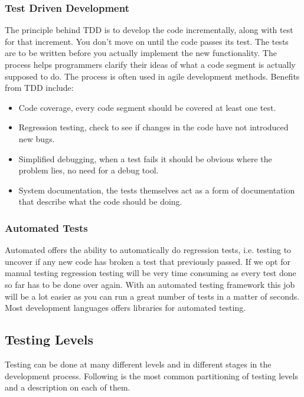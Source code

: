 \subsubsection{Test Driven Development}
The principle behind TDD is to develop the code incrementally, along with test for that increment. You don’t move on until the code passes its test. The tests are to be written before you actually implement the new functionality. The process helps programmers clarify their ideas of what a code segment is actually supposed to do. The process is often used in agile development methods.
Benefits from TDD include: 
\begin{itemize}

\item Code coverage, every code segment should be covered at least one test.

\item Regression testing, check to see if changes in the code have not introduced new bugs.

\item Simplified debugging, when a test fails it should be obvious where the problem lies, no need for a debug tool.

\item System documentation, the tests themselves act as a form of documentation that describe what the code should be doing.

\end{itemize}

\cite{beck2003test-driven}

\subsubsection{Automated Tests}
Automated offers the ability to automatically do regression tests, i.e. testing to uncover if any new code has broken a test that previously passed. If we opt for manual testing regression testing will be very time consuming as every test done so far has to be done over again. With an automated testing framework this job will be a lot easier as you can run a great number of tests in a matter of seconds. Most development languages offers libraries for automated testing.


\subsection{Testing Levels}
Testing can be done at many different levels and in different stages in the development process. Following is the most common partitioning of testing levels and a description on each of them.

